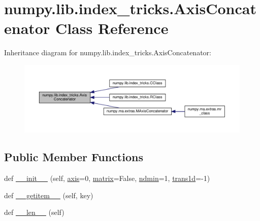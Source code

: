 \hypertarget{classnumpy_1_1lib_1_1index__tricks_1_1AxisConcatenator}{}\section{numpy.\+lib.\+index\+\_\+tricks.\+Axis\+Concatenator Class Reference}
\label{classnumpy_1_1lib_1_1index__tricks_1_1AxisConcatenator}


Inheritance diagram for numpy.\+lib.\+index\+\_\+tricks.\+Axis\+Concatenator\+:
\nopagebreak
\begin{figure}[H]
\begin{center}
\leavevmode
\includegraphics[width=350pt]{classnumpy_1_1lib_1_1index__tricks_1_1AxisConcatenator__inherit__graph}
\end{center}
\end{figure}
\subsection*{Public Member Functions}
\begin{DoxyCompactItemize}
\item 
def \hyperlink{classnumpy_1_1lib_1_1index__tricks_1_1AxisConcatenator_acd1d2fd61f5edbf19205bb60e57d5ee2}{\+\_\+\+\_\+init\+\_\+\+\_\+} (self, \hyperlink{classnumpy_1_1lib_1_1index__tricks_1_1AxisConcatenator_a34cd4e70817918f8f243f77985e25828}{axis}=0, \hyperlink{classnumpy_1_1matrixlib_1_1defmatrix_1_1matrix}{matrix}=False, \hyperlink{classnumpy_1_1lib_1_1index__tricks_1_1AxisConcatenator_a3a5aef13d3fa134f942ee1c843197f7e}{ndmin}=1, \hyperlink{classnumpy_1_1lib_1_1index__tricks_1_1AxisConcatenator_a7d08829f90900781ebd21ef6fbc35360}{trans1d}=-\/1)
\item 
def \hyperlink{classnumpy_1_1lib_1_1index__tricks_1_1AxisConcatenator_aac38d243f5ef049edf544dd2c78335a5}{\+\_\+\+\_\+getitem\+\_\+\+\_\+} (self, key)
\item 
def \hyperlink{classnumpy_1_1lib_1_1index__tricks_1_1AxisConcatenator_a7c0c64e44750a5de064c7d1f47a8741c}{\+\_\+\+\_\+len\+\_\+\+\_\+} (self)
\end{DoxyCompactItemize}
